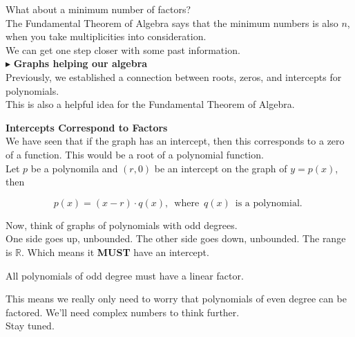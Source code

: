 \documentclass{ximera}
\begin{document}
What about a minimum number of factors? \\

The Fundamental Theorem of Algebra says that the minimum numbers is also $n$, when you take multiplicities into consideration. \\



We can get one step closer with some past information. \\








$\blacktriangleright$ \textbf{\textcolor{blue!55!black}{Graphs helping our algebra}} \\


Previously, we established a connection between roots, zeros, and intercepts for polynomials. \\


This is also a helpful idea for the Fundamental Theorem of Algebra. \\




\begin{idea} \textbf{\textcolor{blue!55!black}{Intercepts Correspond to Factors}}   \\



We have seen that if the graph has an intercept, then this corresponds to a zero of a function.  This would be a root of a polynomial function. \\

Let $p$ be a polynomila and $(r, 0)$ be an intercept on the graph of $y = p(x)$, then 

\[
p(x) = (x-r) \cdot q(x), \, \text{ where } \, q(x) \, \text{ is a polynomial. }
\]

Now, think of graphs of polynomials with odd degrees. \\

One side goes up, unbounded.  The other side goes down, unbounded.  The range is $\mathbb{R}$.  Which means it \textbf{MUST} have an intercept.


All polynomials of odd degree must have a linear factor.




\end{idea}


This means we really only need to worry that polynomials of even degree can be factored.  We'll need complex numbers to think further. \\


Stay tuned.
\end{document}
